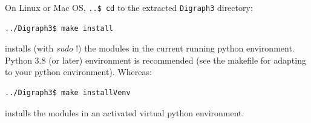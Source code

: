 On Linux or Mac OS, \texttt{..\$ cd} to the extracted \texttt{Digraph3} directory:
\begin{footnotesize}
\begin{verbatim}
../Digraph3$ make install
\end{verbatim}
\end{footnotesize}
installs (with \emph{sudo} !) the \Digraph modules in the current running python environment. Python 3.8 (or later) environment is recommended (see the makefile for adapting to your python environment). Whereas:
\begin{footnotesize}
\begin{verbatim}
../Digraph3$ make installVenv
\end{verbatim}          
\end{footnotesize}
installs the \Digraph modules in an activated virtual python environment.

